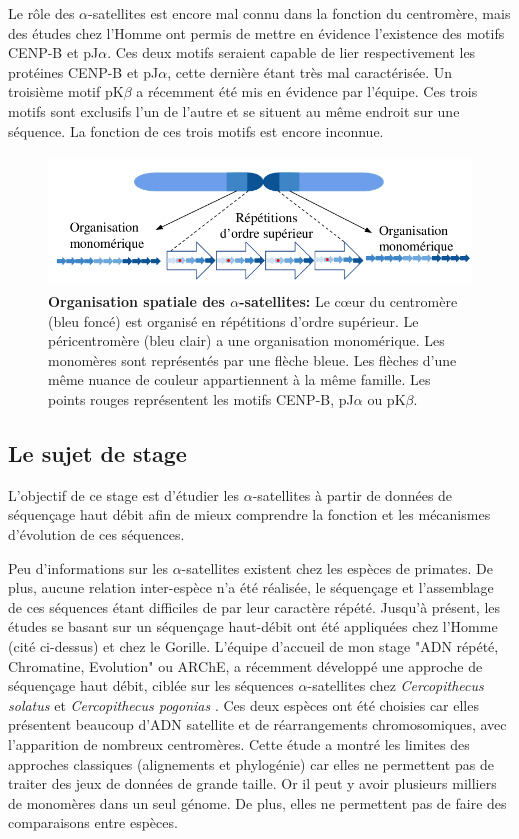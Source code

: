 \documentclass[12pt,a4paper]{article}
\begin{document}
Le rôle des $\alpha$-satellites est encore mal connu dans la fonction du centromère, mais des études chez l'Homme ont permis de mettre en évidence l'existence des motifs CENP-B et pJ$\alpha$. Ces deux motifs seraient capable de lier respectivement les protéines CENP-B et pJ$\alpha$, cette dernière étant très mal caractérisée. Un troisième motif pK$\beta$ a récemment été mis en évidence par l'équipe. Ces trois motifs sont exclusifs l'un de l'autre et se situent au même endroit sur une séquence. La fonction de ces trois motifs est encore inconnue.

\begin{figure}
\center
	\includegraphics[height=3.5cm, width=12cm]{img/AS_organization.png}
	\caption{\textbf{Organisation spatiale des $\alpha$-satellites:} Le cœur du centromère (bleu foncé) est organisé en répétitions d'ordre supérieur. Le péricentromère (bleu clair) a une organisation monomérique. Les monomères sont représentés par une flèche bleue. Les flèches d'une même nuance de couleur appartiennent à la même famille. Les points rouges représentent les motifs CENP-B, pJ$\alpha$ ou pK$\beta$. \label{organisation_spatiale}}
\end{figure}

\subsection{Le sujet de stage}

L'objectif de ce stage est d'étudier les $\alpha$-satellites à partir de données de séquençage haut débit afin de mieux comprendre la fonction  et les mécanismes d'évolution de ces séquences. 

Peu d'informations sur les $\alpha$-satellites existent chez les espèces de primates. De plus, aucune relation inter-espèce n'a été réalisée, le séquençage et l'assemblage de ces séquences étant difficiles de par leur caractère répété. Jusqu'à présent, les études se basant sur un séquençage haut-débit ont été appliquées chez l'Homme (cité ci-dessus) et chez le Gorille. L'équipe d'accueil de mon stage "ADN répété, Chromatine, Evolution" ou ARChE, a récemment développé une approche de séquençage haut débit, ciblée sur les séquences $\alpha$-satellites chez \textit{Cercopithecus solatus} \cite{Cacheux2016} et \textit{Cercopithecus pogonias} \cite{Cacheux2018}. Ces deux espèces ont été choisies car elles présentent beaucoup d'ADN satellite et de réarrangements chromosomiques, avec l'apparition de nombreux centromères. Cette étude a montré les limites des approches classiques (alignements et phylogénie) car elles ne permettent pas de traiter des jeux de données de grande taille. Or il peut y avoir plusieurs milliers de  monomères dans un seul génome. De plus, elles ne permettent pas de faire des comparaisons entre espèces.
\end{document}
